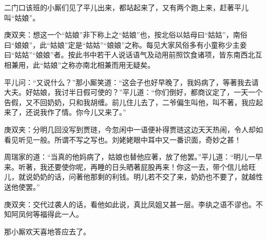 \begin{parag}
    二门口该班的小厮们见了平儿出来，都站起来了，又有两个跑上来，赶著平儿叫“姑娘”。\begin{note}庚双夹：想这一个“姑娘”非下称上之“姑娘”也，按北俗以姑母曰“姑姑”，南俗曰“娘娘”，此“姑娘”定是“姑姑”“娘娘”之称。每见大家风俗多有小童称少主妾曰“姑姑”“娘娘”者。按此书中若干人说话语气及动用前照饮食诸项，皆东南西北互相兼用，此“姑娘”之称亦南北相兼而用无疑矣。\end{note}平儿问：“又说什么？”那小厮笑道：“这会子也好早晚了，我妈病了，等著我去请大夫。好姑娘，我讨半日假可使的？”平儿道：“你们倒好，都商议定了，一天一个告假，又不回奶奶，只和我胡缠。前儿住儿去了，二爷偏生叫他，叫不著，我应起来了，还说我作了情。你今儿又来了。”\begin{note}庚双夹：分明几回没写到贾琏，今忽闲中一语便补得贾琏这边天天热闹，令人却如看见听见一般。所谓不写之写也。刘姥姥眼中耳中又一番识面，奇妙之甚！\end{note}周瑞家的道：“当真的他妈病了，姑娘也替他应著，放了他罢。”平儿道：“明儿一早来。听著，我还要使你呢，再睡的日头晒著屁股再来！你这一去，带个信儿给旺儿，就说奶奶的话，问著他那剩的利钱。明儿若不交了来，奶奶也不要了，就越性送他使罢。”\begin{note}庚双夹：交代过袭人的话，看他如此说，真比凤姐又甚一层。李纨之语不谬也。不知阿凤何等福得此一人。\end{note}那小厮欢天喜地答应去了。
\end{parag}


